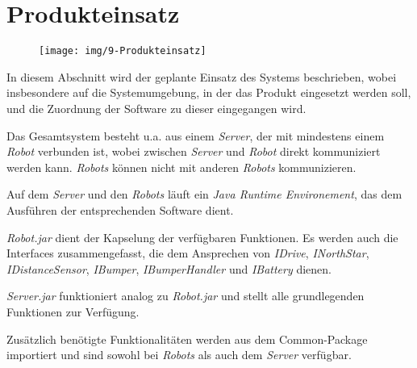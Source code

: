 \section{Produkteinsatz}

\begin{figure}[H]
\centering
\texttt{[image: img/9-Produkteinsatz]}
\label{Produkteinsatz}
\end{figure}

In diesem Abschnitt wird der geplante Einsatz des Systems beschrieben, wobei insbesondere auf die Systemumgebung, in der das Produkt eingesetzt werden soll, und die Zuordnung der Software zu dieser eingegangen wird.

Das Gesamtsystem besteht u.a. aus einem \emph{Server}, der mit mindestens einem \emph{Robot} verbunden ist, wobei zwischen \emph{Server} und \emph{Robot} direkt kommuniziert werden kann. \emph{Robots} können nicht mit anderen \emph{Robots} kommunizieren.

Auf dem \emph{Server} und den \emph{Robots} läuft ein \emph{Java Runtime Environement}, das dem Ausführen der entsprechenden Software dient.

\emph{Robot.jar} dient der Kapselung der verfügbaren Funktionen. Es werden auch die Interfaces zusammengefasst, die dem Ansprechen von \emph{IDrive}, \emph{INorthStar}, \emph{IDistanceSensor}, \emph{IBumper}, \emph{IBumperHandler} und \emph{IBattery} dienen.

\emph{Server.jar} funktioniert analog zu \emph{Robot.jar} und stellt alle grundlegenden Funktionen zur Verfügung.

Zusätzlich benötigte Funktionalitäten werden aus dem Common-Package importiert und sind sowohl bei \emph{Robots} als auch dem \emph{Server} verfügbar.
